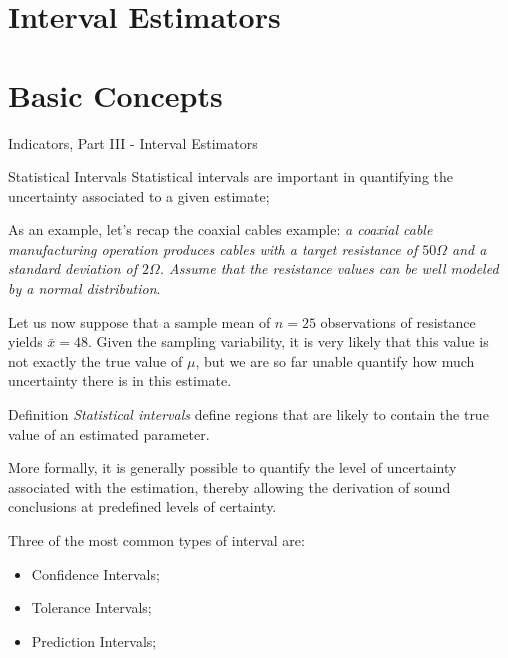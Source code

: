 \section{Interval Estimators}
\section{Basic Concepts}
\begin{frame}
  \begin{center}
    Indicators, Part III - Interval Estimators
  \end{center}
\end{frame}


\begin{frame}{Statistical Intervals}
Statistical intervals are important in quantifying the uncertainty associated to a given estimate;
\bigskip

As an example, let's recap the coaxial cables example: \textit{a coaxial cable manufacturing operation produces cables with a target resistance of $50\Omega$ and a standard deviation of $2\Omega$. Assume that the resistance values can be well modeled by a normal distribution}.
\bigskip

Let us now suppose that a sample mean of $n=25$ observations of resistance  yields $\bar{x} = 48$. Given the sampling variability, it is very likely that this value is not exactly the true value of $\mu$, but we are so far unable quantify how much uncertainty there is in this estimate.
\end{frame}


\begin{frame}{Definition}
\textit{Statistical intervals} define regions that are likely to contain the true value of an estimated parameter.
\bigskip

More formally, it is generally possible to quantify the level of uncertainty associated with the estimation, thereby allowing the derivation of sound conclusions at predefined levels of certainty.
\bigskip

Three of the most common types of interval are:

\begin{itemize}
  \item Confidence Intervals;
  \item Tolerance Intervals;
  \item Prediction Intervals;
\end{itemize}
\end{frame}


